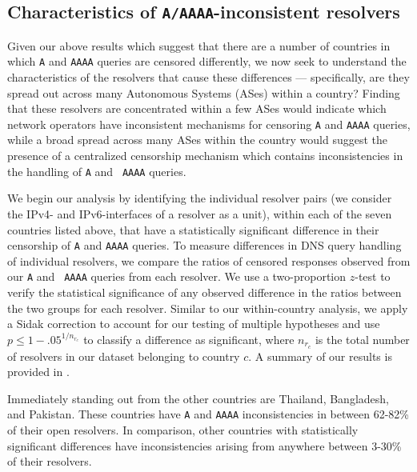\subsection{Characteristics of {\tt A/AAAA}-inconsistent resolvers}
\label{sec:resources:resolvers}
Given our above results which suggest that there are a number of countries in
which {\tt A} and {\tt AAAA} queries are censored differently, we now seek to
understand the characteristics of the resolvers that cause these differences
--- specifically, are they spread out across many Autonomous Systems (ASes)
within a country? Finding that these resolvers are concentrated within a few
ASes would indicate which network operators have inconsistent mechanisms for
censoring {\tt A} and {\tt AAAA} queries, while a broad spread across many ASes
within the country would suggest the presence of a centralized censorship
mechanism which contains inconsistencies in the handling of {\tt A} and {\tt
AAAA} queries. 


%
We begin our analysis by identifying the individual resolver pairs (\ie we
consider the IPv4- and IPv6-interfaces of a resolver as a unit), within each
of the seven countries listed above, that have a statistically significant
difference in their censorship of {\tt A} and {\tt AAAA} queries.
%
To measure differences in DNS query handling of individual resolvers, we
compare the ratios of censored responses observed from our {\tt A} and {\tt
AAAA} queries {from each resolver}.  
%
We use a two-proportion $z$-test to verify the statistical significance of any
observed difference in the ratios between the two groups for each resolver.
Similar to our within-country analysis, we apply a Sidak correction to account
for our testing of multiple hypotheses and use $p \leq 1-{.05}^{1/n_{r_c}}$ to
classify a difference as significant, where $n_{r_c}$ is the total number of
resolvers in our dataset belonging to country $c$.
%
A summary of our results is provided in . 

%
Immediately standing out from the other countries are Thailand, Bangladesh, and
Pakistan. These countries have {\tt A} and {\tt AAAA} inconsistencies in
between 62-82\% of their open resolvers. In comparison, other countries with
statistically significant differences have inconsistencies arising from
anywhere between 3-30\% of their resolvers. 
%

